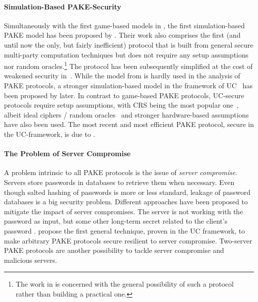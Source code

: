 \paragraph{Simulation-Based \ac{PAKE}-Security}
Simultaneously with the first game-based models in \cite{Bellare2000,Boyko2000}, the first simulation-based \ac{PAKE} model has been proposed by \citet{Goldreich01}.
Their work also comprises the first (and until now the only, but fairly inefficient) protocol that is built from general secure multi-party computation techniques but does not require any setup assumptions nor random oracles.\footnote{The work in \cite{Goldreich01} is concerned with the general possibility of such a protocol rather than building a practical one.}
The protocol has been subsequently simplified at the cost of weakened security in~\cite{NguyenV04}.
While the model from \cite{Goldreich01} is hardly used in the analysis of \ac{PAKE} protocols, a stronger simulation-based model in the framework of \acl{UC}~\cite{Canetti2001a} has been proposed by \citet{Canetti2005} later.
In contrast to game-based \ac{PAKE} protocols, \ac{UC}-secure protocols require setup assumptions, with \ac{CRS} being the most popular one~\cite{Katz2011}, albeit ideal ciphers / random oracles~\cite{Abdalla2008} and stronger hardware-based assumptions~\cite{cryptoeprint:2012:537} have also been used.
The most recent and most efficient \ac{PAKE} protocol, secure in the \ac{UC}-framework, is due to \citet{Benhamouda2013}.

\paragraph{The Problem of Server Compromise}
A problem intrinsic to all \ac{PAKE} protocols is the issue of \emph{server compromise}.
Servers store passwords in databases to retrieve them when necessary.
Even though salted hashing of passwords is more or less standard, leakage of password databases is a big security problem.
Different approaches have been proposed to mitigate the impact of server compromises.
The server is not working with the password as input, but some other long-term secret related to the client's password \cite{Wu1998,Boyen2009a}.
\citet{Gentry2006} propose the first general technique, proven in the \ac{UC} framework, to make arbitrary \ac{PAKE} protocols secure resilient to server compromise.
Two-server \ac{PAKE} protocols are another possibility to tackle server compromise and malicious servers.

